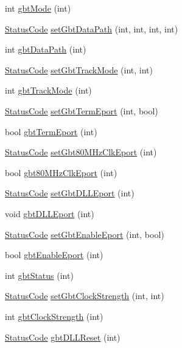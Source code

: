 \begin{DoxyCompactItemize}
\item 
int \hyperlink{classFEB__v1_aab7166214ef0f99f4835ce9a7416e052}{gbt\+Mode} (int)
\item 
\hyperlink{classStatusCode}{Status\+Code} \hyperlink{classFEB__v1_aabd651b11d1119ce3a19b7fb083cca78}{set\+Gbt\+Data\+Path} (int, int, int, int)
\item 
int \hyperlink{classFEB__v1_adf46e43506d1bd7cd26ca62c685e6c98}{gbt\+Data\+Path} (int)
\item 
\hyperlink{classStatusCode}{Status\+Code} \hyperlink{classFEB__v1_ab65b869df2adc4d3880caad71a4e3074}{set\+Gbt\+Track\+Mode} (int, int)
\item 
int \hyperlink{classFEB__v1_a25eeb132e9058cd421a085878fba9204}{gbt\+Track\+Mode} (int)
\item 
\hyperlink{classStatusCode}{Status\+Code} \hyperlink{classFEB__v1_ab7c261039c872c9f039fb7366a84d271}{set\+Gbt\+Term\+Eport} (int, bool)
\item 
bool \hyperlink{classFEB__v1_a84fa302a012eee663fe21829866fb20e}{gbt\+Term\+Eport} (int)
\item 
\hyperlink{classStatusCode}{Status\+Code} \hyperlink{classFEB__v1_a6efa59ad9f80ae40aad2df0b925b0b14}{set\+Gbt80\+M\+Hz\+Clk\+Eport} (int)
\item 
bool \hyperlink{classFEB__v1_ac22b1ffdc20be66330a66ebd12cd13f1}{gbt80\+M\+Hz\+Clk\+Eport} (int)
\item 
\hyperlink{classStatusCode}{Status\+Code} \hyperlink{classFEB__v1_a66584fe850cdf9e4ccd03fd4b2f4db38}{set\+Gbt\+D\+L\+L\+Eport} (int)
\item 
void \hyperlink{classFEB__v1_add5e12a5351c0c4986d24f433155351b}{gbt\+D\+L\+L\+Eport} (int)
\item 
\hyperlink{classStatusCode}{Status\+Code} \hyperlink{classFEB__v1_a30ce0e679748a4e2bf7f953b2162618f}{set\+Gbt\+Enable\+Eport} (int, bool)
\item 
bool \hyperlink{classFEB__v1_ae11c18013b56bdbb947e9ae147d6d77d}{gbt\+Enable\+Eport} (int)
\item 
int \hyperlink{classFEB__v1_a7b47a1b2c7af459b211eed59f4dbe9a7}{gbt\+Status} (int)
\item 
\hyperlink{classStatusCode}{Status\+Code} \hyperlink{classFEB__v1_a717d56186e6221cb20397cc3e496da50}{set\+Gbt\+Clock\+Strength} (int, int)
\item 
int \hyperlink{classFEB__v1_a6ca15de02d32e38a0fc90ad29302072e}{gbt\+Clock\+Strength} (int)
\item 
\hyperlink{classStatusCode}{Status\+Code} \hyperlink{classFEB__v1_a79b299ce9b36b51916103371aef027df}{gbt\+D\+L\+L\+Reset} (int)

\end{DoxyCompactItemize}
